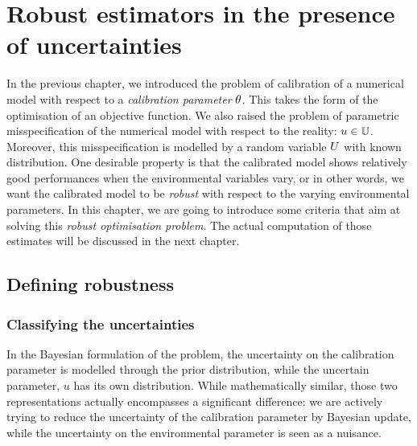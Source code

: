 \documentclass[../../Main_ManuscritThese.tex]{subfiles}
\begin{document}
\chapter{Robust estimators in the presence of uncertainties} 
\label{chap:robust_estimators}

\minitoc
\newpage
\subfileLocal{\pagestyle{contentStyle}}
In the previous chapter, we introduced the problem of calibration of a
numerical model with respect to a \emph{calibration parameter}
$\theta$. This takes the form of the optimisation of an objective
function. We also raised the problem of parametric misspecification of
the numerical model with respect to the reality: $u \in
\mathbb{U}$. Moreover, this misspecification is modelled by a random
variable $U$ with known distribution.  One desirable property is
that the calibrated model shows relatively good performances when the
environmental variables vary, or in other words, we want the
calibrated model to be \emph{robust} with respect to the varying
environmental parameters. In this chapter, we are going to introduce
some criteria that aim at solving this \emph{robust optimisation
  problem}. The actual computation of those estimates will be
discussed in the next chapter.

\section{Defining robustness}
\label{sec:def_robustness}
\subsection{Classifying the uncertainties}
In the Bayesian formulation of the problem, the uncertainty on the
calibration parameter is modelled through the prior distribution,
while the uncertain parameter, $u$ has its own distribution. While
mathematically similar, those two representations actually encompasses
a significant difference: we are actively trying to reduce the
uncertainty of the calibration parameter by Bayesian update, while the
uncertainty on the environmental parameter is seen as a nuisance.
\end{document}
